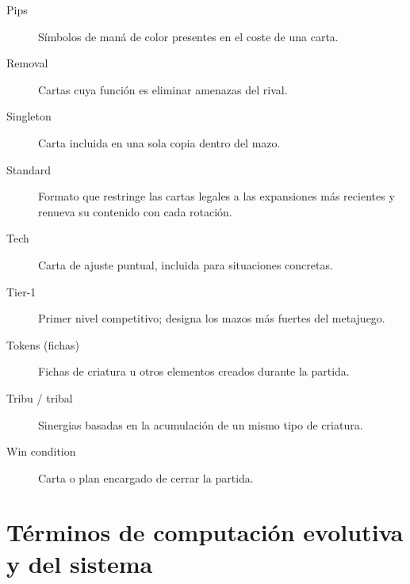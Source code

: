 \begin{description}
    \item[Pips] Símbolos de maná de color presentes en el coste de una carta.
    \item[Removal] Cartas cuya función es eliminar amenazas del rival.
    \item[Singleton] Carta incluida en una sola copia dentro del mazo.
    \item[Standard] Formato que restringe las cartas legales a las expansiones más recientes y renueva su contenido con cada rotación.
    \item[Tech] Carta de ajuste puntual, incluida para situaciones concretas.
    \item[Tier-1] Primer nivel competitivo; designa los mazos más fuertes del metajuego.
    \item[Tokens (fichas)] Fichas de criatura u otros elementos creados durante la partida.
    \item[Tribu / tribal] Sinergias basadas en la acumulación de un mismo tipo de criatura.
    \item[Win condition] Carta o plan encargado de cerrar la partida.
\end{description}

\section*{Términos de computación evolutiva y del sistema}

